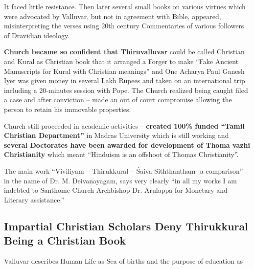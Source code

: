 It faced little resistance. Then later several small books on various virtues which were advocated by Valluvar, but not in agreement with Bible, appeared, misinterpreting the verses using 20th century Commentaries of various followers of Dravidian ideology.

\textbf{Church became so confident that Thiruvalluvar} could be called Christian and Kural as Christian book that it arranged a Forger to make “Fake Ancient Manuscripts for Kural with Christian meanings” and One Acharya Paul Ganesh Iyer was given money in several Lakh Rupees and taken on an international trip including a 20-minutes session with Pope. The Church realized being caught filed a case and after conviction – made an out of court compromise allowing the person to retain his immovable properties.

Church still proceeded in academic activities – \textbf{created 100\% funded “Tamil Christian Department”} in Madras University which is still working and \textbf{several Doctorates have been awarded for development of Thoma vazhi Christianity} which meant “Hinduism is an offshoot of Thomas Christianity”.

The main work “Viviliyam – Thirukkural – Śaiva Siththantham- a comparison” in the name of Dr. M. Deivanayagam, says very clearly “in all my works I am indebted to Santhome Church Archbishop Dr. Arulappa for Monetary and Literary assistance.”

\subsection*{Impartial Christian Scholars Deny Thirukkural Being a Christian Book}

Valluvar describes Human Life as Sea of births and the purpose of education as

